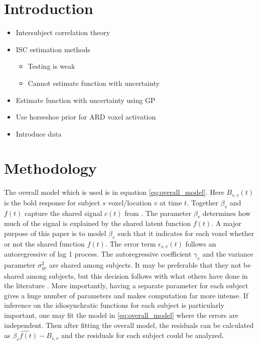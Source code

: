 \section{Introduction}

\begin{itemize}
  \item Intersubject correlation theory
  \item ISC estimation methods
  \begin{itemize}
    \item Testing is weak
    \item Cannot estimate function with uncertainty
  \end{itemize}
  \item Estimate function with uncertainty using GP
  \item Use horseshoe prior for ARD voxel activation
  \item Introduce data
\end{itemize}


\section{Methodology}

The overall model which is used is in equation \ref{eq:overall_model}. Here
$B_{s,v} (t)$ is the bold response for subject $s$ voxel/location $v$ at time
$t$. Together $\beta_v$ and $f(t)$ capture the shared signal $c(t)$ from 
\cite{nastase2019measuring}. The parameter $\beta_v$ determines how much of the
signal is explained by the shared latent function $f(t)$. 
A major purpose of this
paper is to model $\beta_v$ such that it indicates for each voxel whether or 
not the shared function $f(t)$. The error term $\epsilon_{s,v}(t)$ follows an 
autoregressive of lag 1 process. The autoregressive coefficient $\gamma_v$
and the variance parameter $\sigma^2_{\eta v}$ are shared among subjects. It
may be preferable that they not be shared among subjects, but this decision
follows with what others have done in the literature \cite{mejia2020bayesian}.
More importantly, having a 
separate parameter for each subject gives a huge number of parameters and
makes computation far more intense. If inference on the idiosynchratic functions
for each subject is particularly important, one may fit the model in 
\ref{eq:overall_model} where the errors are independent. Then after fitting
the overall model, the residuals can be calculated as 
$\widehat{\beta_v f(t)} - B_{s,v}$ and the residuals for each subject could be 
analyzed.

